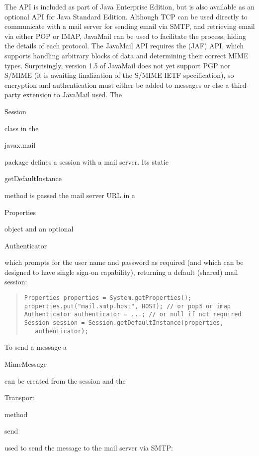The  API is included as part of Java Enterprise Edition, but is
also available as an optional API for Java Standard Edition.
Although TCP can be used directly to communicate with a mail server for sending
email via SMTP, and retrieving email via either POP or IMAP,
JavaMail can be used to facilitate the process, hiding the details of each protocol.
The JavaMail API requires the  (JAF) API,
which supports handling arbitrary blocks of data and determining their correct MIME types.
Surprisingly, version 1.5 of JavaMail does not yet support PGP nor S/MIME
(it is awaiting finalization of the S/MIME IETF specification), so encryption
and authentication must either be added to messages or else a third-party extension
to JavaMail used.
The \begin{code}Session\end{code} class in the \begin{code}javax.mail\end{code} package
defines a session with a mail server. Its static \begin{code}getDefaultInstance\end{code} method
is passed the mail server URL in a \begin{code}Properties\end{code} object and
an optional \begin{code}Authenticator\end{code} which prompts for the user name and
password as required (and which can be designed to have single sign-on capability),
returning a default (shared) mail session:
\begin{quote}\begin{code}\begin{verbatim}
Properties properties = System.getProperties();
properties.put("mail.smtp.host", HOST); // or pop3 or imap
Authenticator authenticator = ...; // or null if not required
Session session = Session.getDefaultInstance(properties,
   authenticator);
\end{verbatim}\end{code}\end{quote}
To send a message a \begin{code}MimeMessage\end{code} can be created
from the session and the \begin{code}Transport\end{code} method
\begin{code}send\end{code} used to send the message to the mail server via SMTP:
